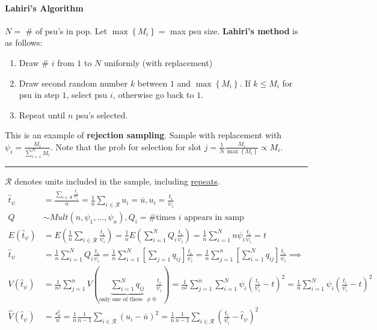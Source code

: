 \documentclass[landscape]{article}
\begin{document}
\begin{multicols*}{3}
\paragraph{Lahiri's Algorithm} $N = $ \# of psu's in pop. Let $\max
\left\{M_i\right\} =$ max psu size. \textbf{Lahiri's method} is as
follows:
\begin{enumerate}
\item Draw \# $i$ from $1$ to $N$ uniformly (with replacement)
\item Draw second random number $k$ between $1$ and $\max
  \left\{M_i\right\}$. If $k \leq M_i$ for psu in step $1$, select psu
  $i$, otherwise go back to $1$.
\item Repeat until $n$ psu's selected.
\end{enumerate}
This is an example of \textbf{rejection sampling}. Sample with
replacement with $\psi_i = \frac{M_i}{\sum_{i=1}^N M_i}$. Note that
the prob for selection for slot $j = \frac{1}{N} \frac{M_i}{\max
  \left\{M_i\right\}} \propto M_i$.
\\ \noindent \rule{0.33\textwidth}{0.5pt}
$\mathcal{R}$ denotes units included in the sample, including \underline{repeats}.
\begin{align*}
  \hat{t}_{\psi} & = \frac{\sum_{i \in \mathcal{R}}\frac{t_i}{\psi_i}}{n} = \frac{1}{n} \sum_{i \in \mathcal{R}} u_i = \overline{u}, u_i = \frac{t_i}{\psi_i}
  \\ Q & \sim Mult(n, \psi_1, \ldots, \psi_n), Q_i = \text{\# times
         $i$ appears in samp}
  \\ E(\hat{t}_{\psi}) & = E \left(\frac{1}{n}\sum_{i \in \mathcal{R}}\frac{t_i}{\psi_i}\right) = \frac{1}{n} E \left(\sum_{i=1}^N Q_i \frac{t_i}{\psi_i}\right) = \frac{1}{n} \sum_{i=1}^N n \psi_i \frac{t_i}{\psi_i} = t
  \\ \hat{t}_{\psi} & = \frac{1}{n} \sum_{i=1}^N Q_i \frac{t_i}{\psi_i} = \frac{1}{n} \sum_{i=1}^N \left[\sum_{j = 1}q_{ij}\right] \frac{t_i}{\psi_i} = \frac{1}{n} \sum_{j=1}^{n} \left[\sum_{i=1}^N q_{ij}\right] \frac{t_i}{\psi_i} \implies
  \\ V(\hat{t}_{\psi}) & = \frac{1}{n^2} \sum_{j=1}^{n} V
                         (\underbrace{\sum_{i=1}^N
                         q_{ij}}_{\text{only one of these } \neq 0} \frac{t_i}{\psi_i}) = \frac{1}{n^2} \sum_{j=1}^{n} \sum_{i=1}^N \psi_i \left(\frac{t_i}{\psi_i} - t\right)^2 = \frac{1}{n} \sum_{i=1}^N \psi_i \left(\frac{t_i}{\psi_i} - t \right)^2
  \\ \hat{V}(\hat{t}_\psi) & = \frac{s_u^2}{n} = \frac{1}{n}\frac{1}{n-1} \sum_{i \in \mathcal{R}} (u_i - \overline{u})^2 = \frac{1}{n}\frac{1}{n-1} \sum_{i \in \mathcal{R}} \left(\frac{t_i}{\psi_i}- \hat{t}_{\psi}\right)^2

\end{align*}
\end{multicols*}
\end{document}
